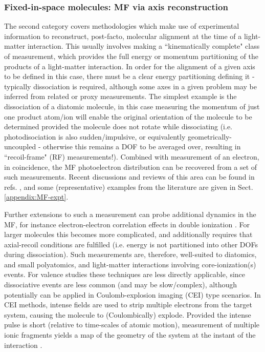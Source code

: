 \documentclass[10pt]{article}
\begin{document}
\subsubsection{Fixed-in-space molecules: MF via axis reconstruction\label{sec:fixed-in-space}}

The second category covers methodologies which make use of experimental information to reconstruct, post-facto, molecular alignment at the time of a light-matter interaction. This usually involves making a ``kinematically complete" class of measurement, which provides the full energy or momentum partitioning of the products of a light-matter interaction. In order for the alignment of a given axis to be defined in this case, there must be a clear energy partitioning defining it - typically dissociation is required, although some axes in a given problem may be inferred from related or proxy measurements. The simplest example is the dissociation of a diatomic molecule, in this case measuring the momentum of just one product atom/ion will enable the original orientation of the molecule to be determined 
provided the molecule does not rotate while dissociating (i.e. photodisociation is also sudden/impulsive, or equivalently geometrically-uncoupled - otherwise this remains a DOF to be averaged over, resulting in ``recoil-frame" (RF) measurements!). Combined with measurement of an electron, in coincidence, the MF photoelectron distribution can be recovered from a set of such measurements. Recent discussions and reviews of this area can be found in refs. \cite{Yagishita2005,Reid2012,dowek2012PhotoionizationDynamicsPhotoemission,Yagishita2015,jahnke2022PhotoelectronDiffraction}, and some (representative) examples from the literature are given in Sect. \ref{appendix:MF-expt}.


Further extensions to such a measurement can probe additional dynamics in the MF, for instance electron-electron correlation effects in double ionization \cite{Akoury2007}. %
For larger molecules this becomes more complicated, and additionally requires that axial-recoil conditions are fulfilled (i.e. energy is not partitioned into other DOFs during dissociation). Such measurements are, therefore, well-suited to diatomics, and small polyatomics, and light-matter interactions involving core-ionization(s) events. For valence studies these techniques are less directly applicable, since dissociative events are less common (and may be slow/complex), although potentially can be applied in Coulomb-explosion imaging (CEI) type scenarios. In CEI methods, intense fields are used to strip multiple electrons from the target system, causing the molecule to (Coulombically) explode. Provided the intense pulse is short (relative to time-scales of atomic motion), measurement of multiple ionic fragments yields a map of the geometry of the system at the instant of the interaction \cite{stapelfeldt1998TimeresolvedCoulombExplosion,Underwood2015,Slater2015}. 
\end{document}

